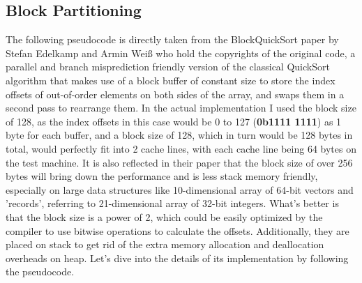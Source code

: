 \documentclass{article}
\begin{document}
\subsection{Block Partitioning}
The following pseudocode is directly taken from the BlockQuickSort paper by Stefan Edelkamp and Armin Weiß \cite{BlockQuickSort} who hold the copyrights of the original code,
a parallel and branch misprediction friendly version of the classical QuickSort algorithm that makes use of a block buffer of constant size to store the index offsets of out-of-order elements on both sides of the array, and swaps them in a second pass to rearrange them.
In the actual implementation I used the block size of 128, as the index offsets in this case would be 0 to 127 (\textbf{0b1111 1111}) as 1 byte for each buffer,
and a block size of 128, which in turn would be 128 bytes in total, would perfectly fit into 2 cache lines, with each cache line being 64 bytes on the test machine.
It is also reflected in their paper that the block size of over 256 bytes will bring down the performance and is less stack memory friendly, especially on large data structures like 10-dimensional array of 64-bit vectors and 'records', referring to 21-dimensional array of 32-bit integers.
What's better is that the block size is a power of 2, which could be easily optimized by the compiler to use bitwise operations to calculate the offsets.
Additionally, they are placed on stack to get rid of the extra memory allocation and deallocation overheads on heap. Let's dive into the details of its implementation by following the pseudocode.
\end{document}
